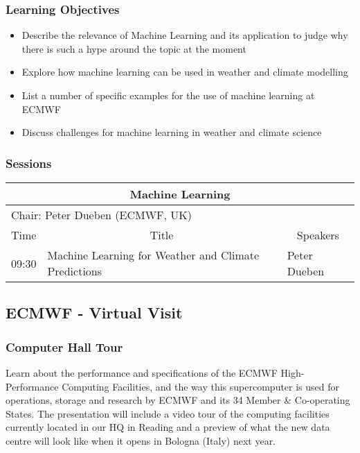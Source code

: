 \subsubsection{Learning Objectives}

\begin{itemize}

\item Describe the relevance of Machine Learning and its application to judge why there is such a hype around the topic at the moment
\item Explore how machine learning can be used in weather and climate modelling
\item List a number of specific examples for the use of machine learning at ECMWF
\item Discuss challenges for machine learning in weather and climate science

\end{itemize}

\subsubsection{Sessions}

\begin{table}[H]
\begin{center}
\begin{tabular}{|l|l|l|}
\hline
\multicolumn{3}{|c|}{\textbf{Machine Learning}} \\ \hline
\multicolumn{3}{|l|}{Chair: Peter Dueben (ECMWF, UK)} \\ \hline \hline
Time & \multicolumn{1}{c|}{Title} & \multicolumn{1}{c|}{Speakers} \\ \hline \hline
09:30 & Machine Learning for Weather and Climate Predictions & Peter Dueben \\ \hline
\hline
\end{tabular}
\end{center}
\end{table}

\subsection{ECMWF - Virtual Visit}

\subsubsection{Computer Hall Tour}

Learn about the performance and specifications of the ECMWF High-Performance Computing Facilities, and the way this supercomputer is used for operations, storage and research by ECMWF and its 34 Member \& Co-operating States. The presentation will include a video tour of the computing facilities currently located in our HQ in Reading and a preview of what the new data centre will look like when it opens in Bologna (Italy) next year.

